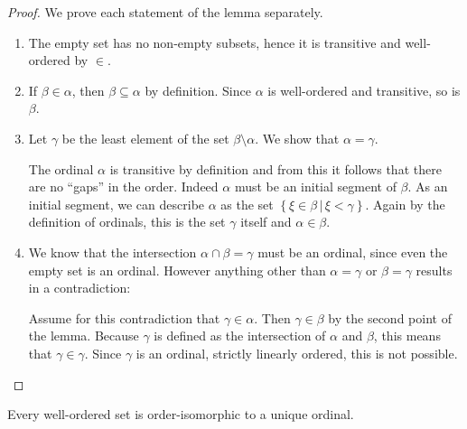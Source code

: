 \documentclass[../../main.tex]{subfiles}
\begin{document}
\begin{proof}
    We prove each statement of the lemma separately.
    \begin{enumerate}
        \item The empty set has no non-empty subsets, hence it is transitive and well-ordered by $\in$.
        \item If $\beta \in \alpha$, then $\beta \subseteq \alpha$ by definition. Since $\alpha$ is well-ordered and transitive, so is $\beta$.
        \item Let $\gamma$ be the least element of the set $\beta \setminus \alpha$. We show that $\alpha = \gamma$.
        
        The ordinal $\alpha$ is transitive by definition and from this it follows that there are no ``gaps'' in the order. Indeed $\alpha$ must be an initial segment of $\beta$.
        As an initial segment, we can describe $\alpha$ as the set $\left\{\xi \in \beta \,\vert\, \xi < \gamma\right\}$.
        Again by the definition of ordinals, this is the set $\gamma$ itself and $\alpha \in \beta$.
        \item We know that the intersection $\alpha \cap \beta = \gamma$ must be an ordinal, since even the empty set is an ordinal.
        However anything other than $\alpha = \gamma$ or $\beta = \gamma$ results in a contradiction:
        
        Assume for this contradiction that $\gamma \in \alpha$. Then $\gamma \in \beta$ by the second point of the lemma. 
        Because $\gamma$ is defined as the intersection of $\alpha$ and $\beta$, this means that $\gamma \in \gamma$.
        Since $\gamma$ is an ordinal, strictly linearly ordered, this is not possible. \qedhere
    \end{enumerate}
\end{proof}

\begin{theorem}\label{unique-ordinal}\cite[Theorem 2]{Jec78}
    Every well-ordered set is order-isomorphic to a unique ordinal.
\end{theorem}
\end{document}
